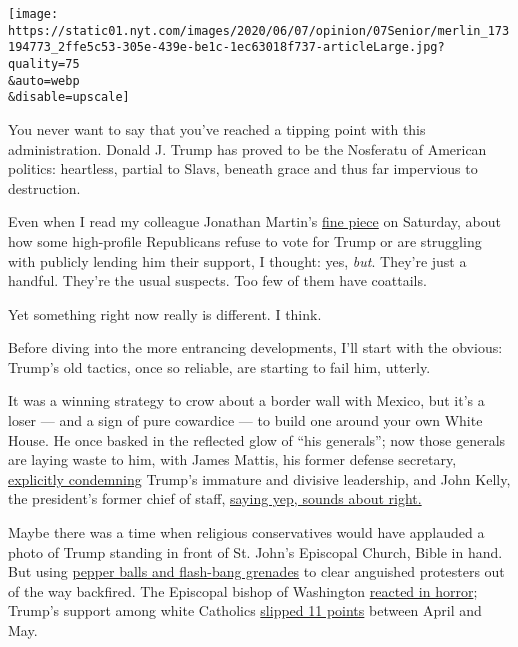 \texttt{[image: https://static01.nyt.com/images/2020/06/07/opinion/07Senior/merlin\_173194773\_2ffe5c53-305e-439e-be1c-1ec63018f737-articleLarge.jpg?quality=75\\\&auto=webp\\\&disable=upscale]}

You never want to say that you've reached a tipping point with this
administration. Donald J. Trump has proved to be the Nosferatu of
American politics: heartless, partial to Slavs, beneath grace and thus
far impervious to destruction.

Even when I read my colleague Jonathan Martin's
\href{https://www.nytimes.com/2020/06/06/us/politics/trump-biden-republicans-voters.html?action=click\&module=Top\%20Stories\&pgtype=Homepage}{fine
piece} on Saturday, about how some high-profile Republicans refuse to
vote for Trump or are struggling with publicly lending him their
support, I thought: yes, \emph{but}. They're just a handful. They're the
usual suspects. Too few of them have coattails.

Yet something right now really is different. I think.

Before diving into the more entrancing developments, I'll start with the
obvious: Trump's old tactics, once so reliable, are starting to fail
him, utterly.

It was a winning strategy to crow about a border wall with Mexico, but
it's a loser --- and a sign of pure cowardice --- to build one around
your own White House. He once basked in the reflected glow of ``his
generals''; now those generals are laying waste to him, with James
Mattis, his former defense secretary,
\href{https://www.theatlantic.com/politics/archive/2020/06/james-mattis-denounces-trump-protests-militarization/612640/}{explicitly
condemning} Trump's immature and divisive leadership, and John Kelly,
the president's former chief of staff,
\href{https://www.cbsnews.com/news/john-kelly-trump-military-force-agrees-with-mattis/}{saying
yep, sounds about right.}

Maybe there was a time when religious conservatives would have applauded
a photo of Trump standing in front of St. John's Episcopal Church, Bible
in hand. But using
\href{https://www.usatoday.com/in-depth/graphics/2020/06/05/george-floyd-protests-trump-church-photo-curfew-park/3127684001/}{pepper
balls and flash-bang grenades} to clear anguished protesters out of the
way backfired. The Episcopal bishop of Washington
\href{https://www.washingtonpost.com/religion/bishop-budde-trump-church/2020/06/01/20ca70f8-a466-11ea-b619-3f9133bbb482_story.html}{reacted
in horror}; Trump's support among white Catholics
\href{https://www.prri.org/research/trump-favorability-white-catholic-and-non-college-americans-national-unrest-protests/}{slipped
11 points} between April and May.

